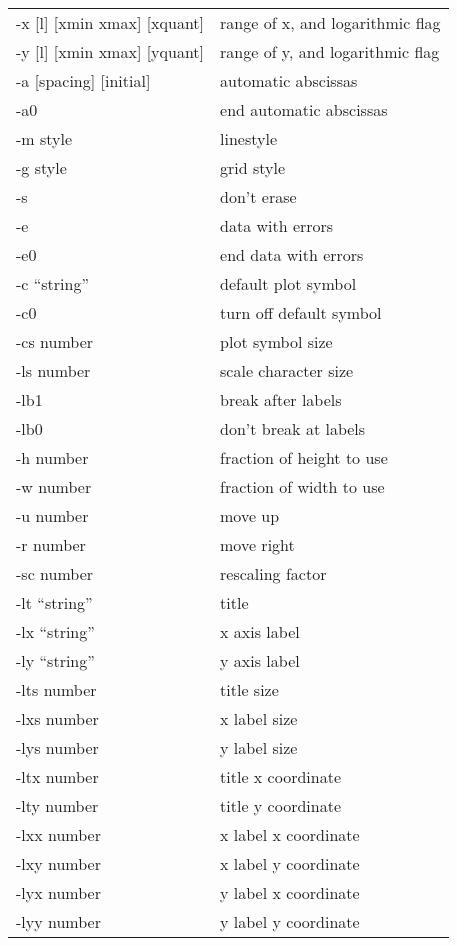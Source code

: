 \begin{tabular}{ll}
-x [l] [xmin xmax] [xquant] & range of x, and logarithmic flag\\
-y [l] [xmin xmax] [yquant] & range of y, and logarithmic flag\\
-a [spacing] [initial] & automatic abscissas\\
-a0 & end automatic abscissas\\
-m style & linestyle\\
-g style & grid style\\
-s & don't erase\\
-e & data with errors\\
-e0 & end data with errors\\
-c ``string'' & default plot symbol\\
-c0 & turn off default symbol\\
-cs number & plot symbol size\\
-ls number & scale character size\\
-lb1 & break after labels\\
-lb0 & don't break at labels\\
-h number & fraction of height to use\\
-w number & fraction of width to use\\
-u number & move up\\
-r number & move right\\
-sc number & rescaling factor\\
-lt ``string'' & title\\
-lx ``string'' & x axis label\\
-ly ``string'' & y axis label\\
-lts number & title size\\
-lxs number & x label size\\
-lys number & y label size\\
-ltx number & title x coordinate\\
-lty number & title y coordinate\\
-lxx number & x label x coordinate\\
-lxy number & x label y coordinate\\
-lyx number & y label x coordinate\\
-lyy number & y label y coordinate
\end{tabular}


